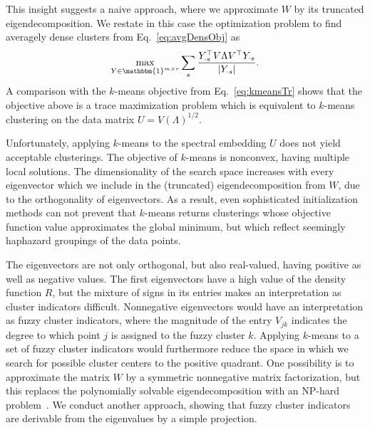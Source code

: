  This insight suggests a naive approach, where we approximate $W$ by its truncated eigendecomposition. We restate in this case the optimization problem to find averagely dense clusters from Eq.~\eqref{eq:avgDensObj} as
\begin{align}\label{eq:approxTrunc}
\max_{Y\in\mathbbm{1}^{m\times r}} \sum_s \frac{Y_{\cdot s}^\top V\Lambda V^\top Y_{\cdot s}}{\lvert Y_{\cdot s}\rvert }.
\end{align}
A comparison with the $k$-means objective from Eq.~\eqref{eq:kmeansTr} shows that the objective above is a trace maximization problem which is equivalent to $k$-means clustering on the data matrix $U=V(\Lambda)^{1/2}$. 

Unfortunately, applying $k$-means to the spectral embedding $U$ does not yield acceptable clusterings. The objective of $k$-means is nonconvex, having multiple local solutions. The dimensionality of the search space increases with every eigenvector which we include in the (truncated) eigendecomposition from $W$, due to the orthogonality of eigenvectors. As a result, even sophisticated initialization methods can not prevent that $k$-means returns clusterings whose objective function value approximates the global minimum, but which reflect seemingly haphazard groupings of the data points.

The eigenvectors are not only orthogonal, but also real-valued, having positive as well as negative values. The first eigenvectors have a high value of the density function $R$, but the mixture of signs in its entries makes an interpretation as cluster indicators difficult. Nonnegative eigenvectors would have an interpretation as fuzzy cluster indicators, where the magnitude of the entry $V_{jk}$ indicates the degree to which point $j$ is assigned to the fuzzy cluster $k$. Applying $k$-means to a set of fuzzy cluster indicators would furthermore reduce the space in which we search for possible cluster centers to the positive quadrant. One possibility is to approximate the matrix $W$ by a symmetric nonnegative matrix factorization, but this replaces the polynomially solvable eigendecomposition with an NP-hard problem~\citep{vavasis2009complexity}. 
We conduct another approach, showing that fuzzy cluster indicators are derivable from the eigenvalues by a simple projection.

